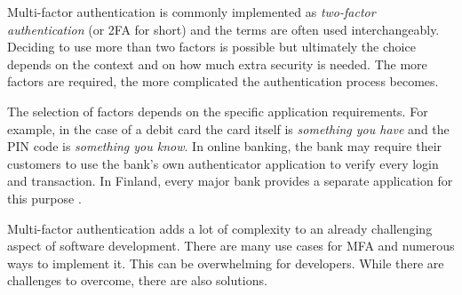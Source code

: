 Multi-factor authentication is commonly implemented as \textit{two-factor authentication} (or 2FA for short) and the terms are often used interchangeably. Deciding to use more than two factors is possible but ultimately the choice depends on the context and on how much extra security is needed. The more factors are required, the more complicated the authentication process becomes.

The selection of factors depends on the specific application requirements. For example, in the case of a debit card the card itself is \textit{something you have} and the PIN code is \textit{something you know}. In online banking, the bank may require their customers to use the bank's own authenticator application to verify every login and transaction. In Finland, every major bank provides a separate application for this purpose \citep{danske_id_2024, nordea_id_2024, op_mobile_2024}.

Multi-factor authentication adds a lot of complexity to an already challenging aspect of software development. There are many use cases for MFA and numerous ways to implement it. This can be overwhelming for developers. While there are challenges to overcome, there are also solutions.
